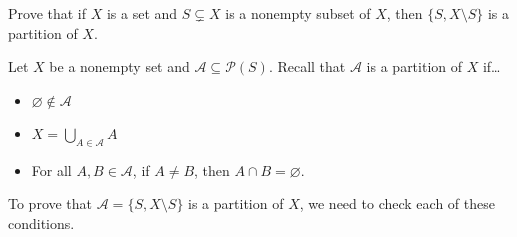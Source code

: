 \documentclass[11pt,letterpaper]{article}
\begin{document}
\newpage





 Prove that if $X$ is a set and $S \subsetneq X$ is a nonempty subset of $X$, then $\{ S, X \setminus S \}$ is a partition of $X$. \pspace

\sol Let $X$ be a nonempty set and $\mathcal{A} \subseteq \mathcal{P}(S)$. Recall that $\mathcal{A}$ is a partition of $X$ if\dots
	\begin{itemize}
	\item $\varnothing \notin \mathcal{A}$
	\item $X= \bigcup_{A \in \mathcal{A}} A$
	\item For all $A, B \in \mathcal{A}$, if $A \neq B$, then $A \cap B= \varnothing$. 
	\end{itemize}
To prove that $\mathcal{A}= \{ S, X \setminus S \}$ is a partition of $X$, we need to check each of these conditions. 
\end{document}
